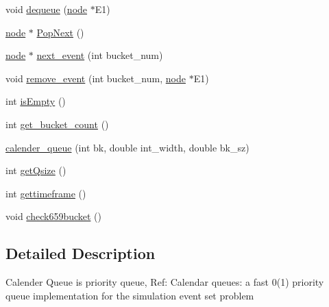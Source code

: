 \begin{DoxyCompactItemize}
\item 
void \hyperlink{classcalender__queue_a7c07ffcbca12cfd91018963c70c1542a}{dequeue} (\hyperlink{classnode}{node} $\ast$E1)
\item 
\hyperlink{classnode}{node} $\ast$ \hyperlink{classcalender__queue_adbc1d16f019e929d53e8448e98fa92b9}{Pop\-Next} ()
\item 
\hyperlink{classnode}{node} $\ast$ \hyperlink{classcalender__queue_aa75ebefb2a4219895c3b44219077c870}{next\-\_\-event} (int bucket\-\_\-num)
\item 
void \hyperlink{classcalender__queue_ac5780ed685a1c4725b53857cc525c7e7}{remove\-\_\-event} (int bucket\-\_\-num, \hyperlink{classnode}{node} $\ast$E1)
\item 
int \hyperlink{classcalender__queue_a8d42460de7de2396f588c8f9a5aa099f}{is\-Empty} ()
\item 
int \hyperlink{classcalender__queue_a78818b6767d5f432dd4b4e629ca72435}{get\-\_\-bucket\-\_\-count} ()
\item 
\hyperlink{classcalender__queue_ace3cfae6b7e3a8bcf3a5a84b270ef0f8}{calender\-\_\-queue} (int bk, double int\-\_\-width, double bk\-\_\-sz)
\item 
int \hyperlink{classcalender__queue_ac6b4b6d42278a5c88de4550d4b7f4017}{get\-Qsize} ()
\item 
int \hyperlink{classcalender__queue_a3985b2b2d55245ec4b70e79e1588c608}{gettimeframe} ()
\item 
void \hyperlink{classcalender__queue_a3b911c0f17d0cac2ff6c2a261d123a78}{check659bucket} ()
\end{DoxyCompactItemize}


\subsection{Detailed Description}
Calender Queue is priority queue, Ref\-: Calendar queues\-: a fast 0(1) priority queue implementation for the simulation event set problem 

